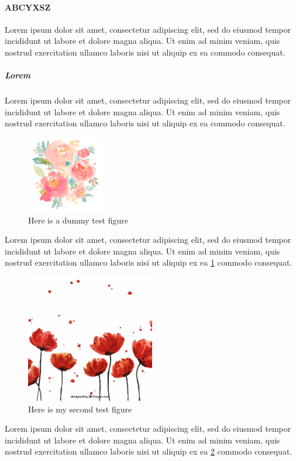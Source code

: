 \documentclass[a4paper,12pt]{article}
\begin{document}
\paragraph*{ABCYXSZ} Lorem ipsum dolor sit amet, consectetur adipiscing elit, sed do eiusmod tempor incididunt ut labore et dolore magna aliqua. Ut enim ad minim veniam, quis nostrud exercitation ullamco laboris nisi ut aliquip ex ea commodo consequat.
\subparagraph{Lorem} Lorem ipsum dolor sit amet, consectetur adipiscing elit, sed do eiusmod tempor incididunt ut labore et dolore magna aliqua. Ut enim ad minim veniam, quis nostrud exercitation ullamco laboris nisi ut aliquip ex ea commodo consequat.\\
\begin{figure}
\centering
\includegraphics[width=0.3\textwidth]{Images/dummy_2}
\caption{Here is a dummy test figure}
\label{floral}
\end{figure}
Lorem ipsum dolor sit amet, consectetur adipiscing elit, sed do eiusmod tempor incididunt ut labore et dolore magna aliqua. Ut enim ad minim veniam, quis nostrud exercitation ullamco laboris nisi ut aliquip ex ea \ref{floral} commodo consequat.\\
\linebreak
\begin{figure}
\centering
\includegraphics[width=0.5\textwidth]{Images/dummy_3}
\caption{Here is my second test figure}
\label{floral2}
\end{figure}
Lorem ipsum dolor sit amet, consectetur adipiscing elit, sed do eiusmod tempor incididunt ut labore et dolore magna aliqua. Ut enim ad minim veniam, quis nostrud exercitation ullamco laboris nisi ut aliquip ex ea \ref{floral2} commodo consequat.\\
\end{document}

